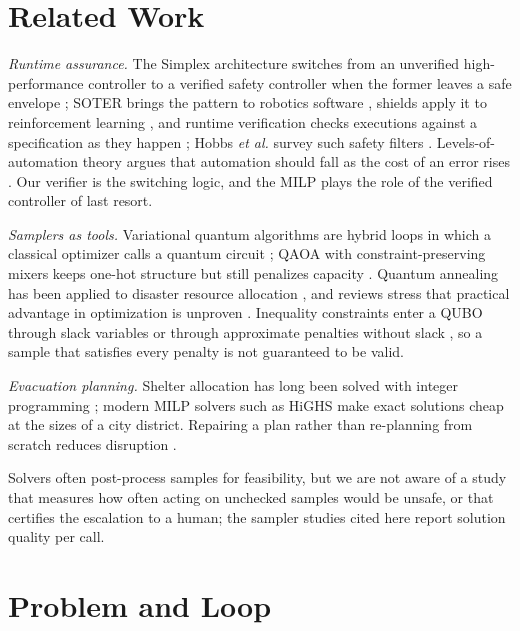 \documentclass[conference]{IEEEtran}
\begin{document}
\section{Related Work}
\textit{Runtime assurance.} The Simplex architecture switches from an unverified high-performance controller to a verified safety controller when the former leaves a safe envelope \cite{Sha2001}; SOTER brings the pattern to robotics software \cite{Desai2019}, shields apply it to reinforcement learning \cite{Alshiekh2018}, and runtime verification checks executions against a specification as they happen \cite{Leucker2009}; Hobbs \textit{et al.} survey such safety filters \cite{Hobbs2023}. Levels-of-automation theory argues that automation should fall as the cost of an error rises \cite{Parasuraman2000}. Our verifier is the switching logic, and the MILP plays the role of the verified controller of last resort.

\textit{Samplers as tools.} Variational quantum algorithms are hybrid loops in which a classical optimizer calls a quantum circuit \cite{McClean2016}; QAOA with constraint-preserving mixers keeps one-hot structure but still penalizes capacity \cite{Hadfield2019,WangZ2020}. Quantum annealing has been applied to disaster resource allocation \cite{Cadelina2024}, and reviews stress that practical advantage in optimization is unproven \cite{Abbas2024}. Inequality constraints enter a QUBO through slack variables or through approximate penalties without slack \cite{Glover2019,Montanez2024}, so a sample that satisfies every penalty is not guaranteed to be valid.

\textit{Evacuation planning.} Shelter allocation has long been solved with integer programming \cite{Sherali1991}; modern MILP solvers such as HiGHS \cite{Huangfu2018} make exact solutions cheap at the sizes of a city district. Repairing a plan rather than re-planning from scratch reduces disruption \cite{Fox2006}.

Solvers often post-process samples for feasibility, but we are not aware of a study that measures how often acting on unchecked samples would be unsafe, or that certifies the escalation to a human; the sampler studies cited here report solution quality per call.


\section{Problem and Loop}
\end{document}
